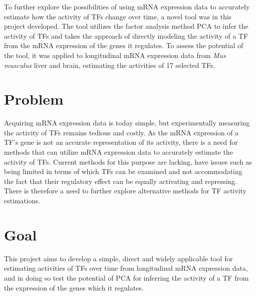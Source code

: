To further explore the possibilities of using mRNA expression data to accurately estimate how the activity of \acp{TF} change over time, a novel tool was in this project developed. The tool utilizes the factor analysis method \ac{PCA} to infer the activity of \acp{TF} and takes the approach of directly modeling the activity of a \ac{TF} from the mRNA expression of the genes it regulates. To assess the potential of the tool, it was applied to longitudinal mRNA expression data from \textit{Mus musculus} liver and brain, estimating the activities of 17 selected \acp{TF}.

\section{Problem}
\label{sec:problem}
Acquiring mRNA expression data is today simple, but experimentally measuring the activity of \acp{TF} remains tedious and costly. As the mRNA expression of a \ac{TF}'s gene is not an accurate representation of its activity, there is a need for methods that can utilize mRNA expression data to accurately estimate the activity of \acp{TF}. Current methods for this purpose are lacking, have issues such as being limited in terms of which \acp{TF} can be examined and not accommodating the fact that their regulatory effect can be equally activating and repressing. There is therefore a need to further explore alternative methods for \ac{TF} activity estimations.

\section{Goal}
\label{sec:goal}
This project aims to develop a simple, direct and widely applicable tool for estimating activities of \acp{TF} over time from longitudinal mRNA expression data, and in doing so test the potential of \ac{PCA} for inferring the activity of a \ac{TF} from the expression of the genes which it regulates.